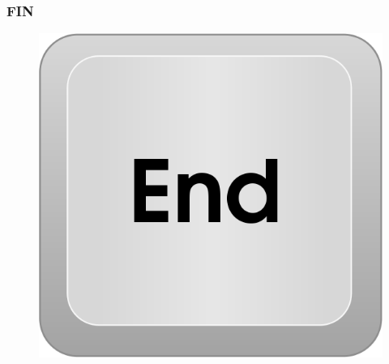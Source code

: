 \documentclass{beamer}
\begin{document}
\begin{frame}
\frametitle{FIN}
\begin{figure}
\includegraphics[scale=0.4]{imagenes/end.png}
\end{figure}
\end{frame}
\end{document}
